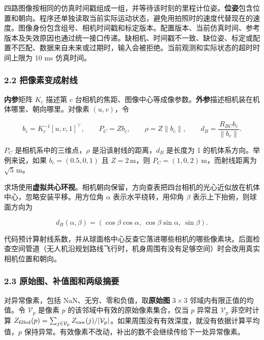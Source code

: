 \documentclass[11pt,a4paper]{article}
\numberwithin{equation}{topic}
\begin{document}
四路图像按相同的仿真时间戳组成一组，并等待该时刻的里程计位姿。\textbf{位姿}包含位置和朝向。程序还单独读取当前实际运动状态，避免用拍照时的速度代替现在的速度。图像身份包含组号、相机时间戳和标定版本。配置版本、当前仿真时间、参考版本及失效原因也通过统一接口传递。缺相机、时间戳不一致、缺位姿、标定或配置不匹配、数据来自未来或过期时，输入会被拒绝。当前观测和实际状态的超时时间上限为 10 ms 仿真时间。 

\subsubsection*{2.2 把像素变成射线}

\textbf{内参}矩阵 \(K_c\) 描述第 \(c\) 台相机的焦距、图像中心等成像参数。\textbf{外参}描述相机装在机体哪里、朝向哪里。对像素 \((u,v)\)，令

\begin{equation}
\label{eq:ray}
b_c=K_c^{-1}[u,v,1]^\top,\qquad
P_C=Zb_c,\qquad
\rho=Z\|b_c\|,\qquad
d_B=\frac{R_{BC}b_c}{\|b_c\|}.
\end{equation}

\(P_C\) 是相机系中的三维点，\(\rho\) 是沿该射线的距离，\(d_B\) 是长度为 1 的机体系方向。举例来说，如果 \(b_c=(0.5,0,1)\) 且 \(Z=2\,\mathrm m\)，则 \(P_C=(1,0,2)\,\mathrm m\)，而射线距离为 \(\sqrt5\,\mathrm m\)。

求场使用\textbf{虚拟共心环视}。相机朝向保留，方向查表把四台相机的光心近似放在机体中心，忽略安装平移。用方位角 \(\alpha\) 表示水平绕转，用仰角 \(\beta\) 表示上下抬俯，则球面方向为

\begin{equation}
\label{eq:sphere}
d_B(\alpha,\beta)=
(\cos\beta\cos\alpha,\ \cos\beta\sin\alpha,\ \sin\beta).
\end{equation}

代码预计算射线系数，并从球面格中心反查它落进哪些相机的哪些像素块。后面检查空间管道（无人机沿规划路线飞行时，机身周围有没有足够空间）时会改用真实相机位置和朝向。

\subsubsection*{2.3 原始图、补值图和两级摘要}

对异常像素，包括 NaN、无穷、零和负值，取\textbf{原始图} \(3\times3\) 邻域内有限正值的均值。令 \(\mathcal V_p\) 是像素 \(p\) 的该邻域中有效的原始像素集合，仅当 \(p\) 异常且 \(\mathcal V_p\) 非空时计算 \(Z_{\rm filled}(p)=\sum_{j\in\mathcal V_p} Z_{\rm raw}(j)/|\mathcal V_p|\)。如果周围没有有效深度，就没有依据计算平均值，\(p\) 保持异常。有效像素不改动，补出的数不会继续传给下一处异常像素。
\end{document}
